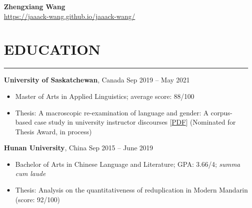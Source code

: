 \documentclass[a4paper, 11pt]{article}  %
\begin{document}

\begin{center}

	\huge \textbf{Zhengxiang Wang} \vspace{11pt} \\  %
	\small \url{https://jaaack-wang.github.io/jaaack-wang/} 

\end{center}

\section*{EDUCATION} %
\hrule %
\vspace{11pt} %

\textbf{University of Saskatchewan}, Canada \hfill Sep 2019 – May 2021 %

\begin{itemize}
	\itemsep0em %
	
	\item{Master of Arts in Applied Linguistics; average score: 88/100}
	\item{Thesis: A macroscopic re-examination of language and gender: A corpus-based case study in university instructor discourses [\href{https://harvest.usask.ca/bitstream/handle/10388/13387/WANG-THESIS-2021.pdf?sequence=1\&isAllowed=y}{PDF}] (Nominated for Thesis Award, in process)}
	
\end{itemize}

\vspace{11pt}

\noindent
\textbf{Hunan University}, China \hfill Sep 2015 – June 2019

\begin{itemize}
	\itemsep0em 
	
	\item{Bachelor of Arts in Chinese Language and Literature; GPA: 3.66/4; \emph{summa cum laude}}
	\item{Thesis: Analysis on the quantitativeness of reduplication in Modern Mandarin (score: 92/100)}
	
\end{itemize}
\end{document}
